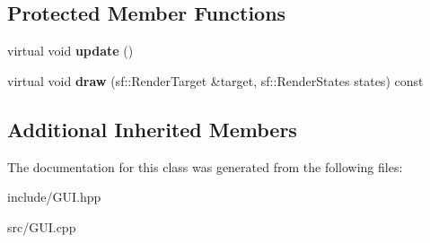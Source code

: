 \subsection*{Protected Member Functions}
\begin{DoxyCompactItemize}
\item 
\hypertarget{class_g_u_i_a947e568bf884a8798e3e368417f662c7}{virtual void {\bfseries update} ()}\label{class_g_u_i_a947e568bf884a8798e3e368417f662c7}

\item 
\hypertarget{class_g_u_i_a8715710585e90991ac80329217538f27}{virtual void {\bfseries draw} (sf\-::\-Render\-Target \&target, sf\-::\-Render\-States states) const }\label{class_g_u_i_a8715710585e90991ac80329217538f27}

\end{DoxyCompactItemize}
\subsection*{Additional Inherited Members}


The documentation for this class was generated from the following files\-:\begin{DoxyCompactItemize}
\item 
include/G\-U\-I.\-hpp\item 
src/G\-U\-I.\-cpp\end{DoxyCompactItemize}

